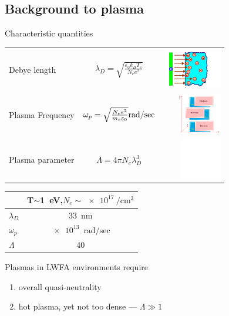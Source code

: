 \documentclass[dvipsnames]{beamer}
\begin{document}
  \subsection{Background to plasma}
  \begin{frame}{Characteristic quantities}
    \begin{tabular}{l c r}
     Debye length & $\lambda_D=\sqrt{\frac{\varepsilon_0 k_B T_e}{N_e e^2}}$ &  \includegraphics[height=50pt]{figures/theory/nernst2.png}\\ 
     Plasma Frequency & $ \omega_p=\sqrt{\frac{N_e e^2}{m_e \varepsilon_0}}\si[per-mode=fraction]{\radian\per\sec} $ & \includegraphics[height=50pt]{figures/theory/plasma_oscillation.png}\\
     Plasma parameter & $ \Lambda=4\pi N_e \lambda_D ^3 $ & \includegraphics[height=50pt]{figures/theory/white_background.png} \\
    \end{tabular}
  \end{frame}
  \begin{frame}{}
      \begin{table}[]
    \begin{tabular}{l | c}
      & T$\sim$\SI{1}{\electronvolt},$N_e\sim\SI{e17}{\per\cubic\cm}$ \\ \hline 
      $\lambda_D$     & \SI{33}{\nm}     \\
      $\omega_p$      & $\SI[per-mode=fraction]{e13}{\radian\per\sec}$   \\
      $\Lambda$ & 40
    \end{tabular}
      \end{table}
  Plasmas in LWFA environments require
    \begin{enumerate}
      \item[\textbullet] overall quasi-neutrality
      \item[\textbullet] hot plasma, yet not too dense --- $\Lambda \gg 1$
    \end{enumerate}
  \end{frame}
\end{document}
